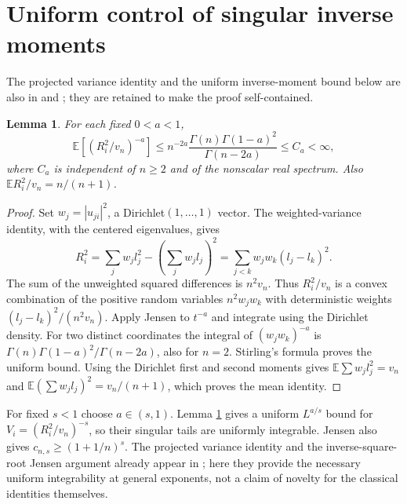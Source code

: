 \documentclass[11pt]{article}
\newtheorem{lemma}[theorem]{Lemma}
\newcommand{\E}{\mathbb E}
\begin{document}
\section{Uniform control of singular inverse moments}
The projected variance identity and the uniform inverse-moment bound below are also in \cite{CMcontrol} and \cite[Lemma 7, (19)]{Vecer}; they are retained to make the proof self-contained.
\begin{lemma}\label{lem:inverse}
For each fixed $0<a<1$,
\begin{equation}
\E[(R_i^2/v_n)^{-a}]\le n^{-2a}\frac{\Gamma(n)\Gamma(1-a)^2}{\Gamma(n-2a)}\le C_a<\infty,\label{eq:negative}
\end{equation}
where $C_a$ is independent of $n\ge2$ and of the nonscalar real spectrum. Also $\E R_i^2/v_n=n/(n+1)$.
\end{lemma}
\begin{proof}
Set $w_j=|u_{ji}|^2$, a Dirichlet$(1,\ldots,1)$ vector. The weighted-variance identity, with the centered eigenvalues, gives
\begin{equation}
R_i^2=\sum_j w_jl_j^2-\left(\sum_jw_jl_j\right)^2
=\sum_{j<k}w_jw_k(l_j-l_k)^2.
\end{equation}
The sum of the unweighted squared differences is $n^2v_n$. Thus $R_i^2/v_n$ is a convex combination of the positive random variables $n^2w_jw_k$ with deterministic weights $(l_j-l_k)^2/(n^2v_n)$. Apply Jensen to $t^{-a}$ and integrate using the Dirichlet density. For two distinct coordinates the integral of $(w_jw_k)^{-a}$ is $\Gamma(n)\Gamma(1-a)^2/\Gamma(n-2a)$, also for $n=2$. Stirling's formula proves the uniform bound. Using the Dirichlet first and second moments gives $\E\sum w_jl_j^2=v_n$ and $\E(\sum w_jl_j)^2=v_n/(n+1)$, which proves the mean identity.
\end{proof}
For fixed $s<1$ choose $a\in(s,1)$. Lemma \ref{lem:inverse} gives a uniform $L^{a/s}$ bound for $V_i=(R_i^2/v_n)^{-s}$, so their singular tails are uniformly integrable. Jensen also gives $c_{n,s}\ge (1+1/n)^s$. The projected variance identity and the inverse-square-root Jensen argument already appear in \cite{CMcontrol}; here they provide the necessary uniform integrability at general exponents, not a claim of novelty for the classical identities themselves.
\end{document}
